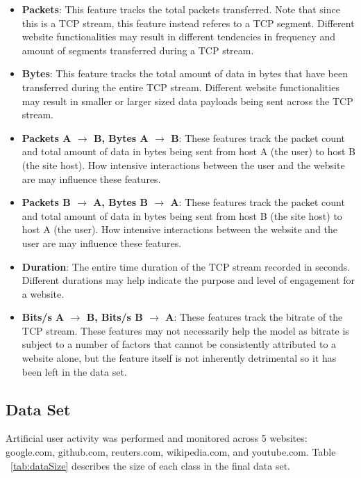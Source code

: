 \documentclass[10pt,sigconf,letterpaper,nonacm]{acmart}
\begin{document}
\begin{itemize}
  \item \textbf{Packets}: This feature tracks the total packets transferred. Note that since this is a TCP stream, this feature instead referes to a TCP segment. Different website functionalities may result in different tendencies in frequency and amount of segments transferred during a TCP stream.
  
  \item \textbf{Bytes}: This feature tracks the total amount of data in bytes that have been transferred during the entire TCP stream. Different website functionalities may result in smaller or larger sized data payloads being sent across the TCP stream.
  
  \item \textbf{Packets A $\rightarrow$ B, Bytes A $\rightarrow$ B}: These features track the packet count and total amount of data in bytes being sent from host A (the user) to host B (the site host). How intensive interactions between the user and the website are may influence these features.
  
  \item \textbf{Packets B $\rightarrow$ A, Bytes B $\rightarrow$ A}: These features track the packet count and total amount of data in bytes being sent from host B (the site host) to host A (the user). How intensive interactions between the website and the user are may influence these features.
  
  \item \textbf{Duration}: The entire time duration of the TCP stream recorded in seconds. Different durations may help indicate the purpose and level of engagement for a website.
  
  \item \textbf{Bits/s A $\rightarrow$ B, Bits/s B $\rightarrow$ A}: These features track the bitrate of the TCP stream. These features may not necessarily help the model as bitrate is subject to a number of factors that cannot be consistently attributed to a website alone, but the feature itself is not inherently detrimental so it has been left in the data set.
\end{itemize}

\subsection{Data Set}

Artificial user activity was performed and monitored across 5 websites: google.com, github.com, reuters.com, wikipedia.com, and youtube.com.
Table ~\ref{tab:dataSize} describes the size of each class in the final data set.
\end{document}
